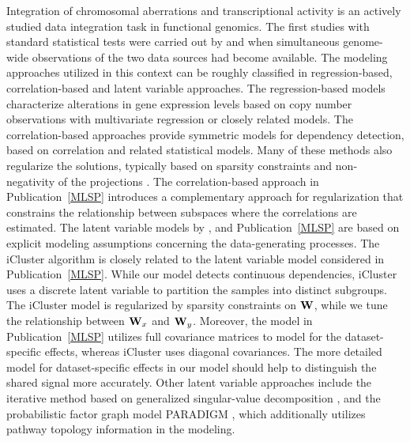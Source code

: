 Integration of chromosomal aberrations and transcriptional activity is
an actively studied data integration task in functional genomics. The
first studies with standard statistical tests were carried out by
\citet{Hyman2002} and \citet{Phillips2001} when simultaneous
genome-wide observations of the two data sources had become available.
The modeling approaches utilized in this context can be roughly
classified in regression-based, correlation-based and latent variable
approaches. The regression-based models \citep{Adler2006, Bicciato09,
  Wieringen09} characterize alterations in gene expression levels
based on copy number observations with multivariate regression or
closely related models. The correlation-based approaches
\citep{Gonzalez2009, Schafer09, Soneson2010} provide symmetric models
for dependency detection, based on correlation and related statistical
models. Many of these methods also regularize the solutions, typically
based on sparsity constraints and non-negativity of the projections
\citep{LeCao2009, Waaijenborg2008, Witten09, Parkhomenko2009}. The
correlation-based approach in Publication~\ref{MLSP} introduces a
complementary approach for regularization that constrains the
relationship between subspaces where the correlations are
estimated. The latent variable models by \cite{Berger06, Shen09,
  Vaske2010}, and Publication~\ref{MLSP} are based on explicit
modeling assumptions concerning the data-generating processes. The
iCluster algorithm \citep{Shen09} is closely related to the latent
variable model considered in Publication~\ref{MLSP}. While our model
detects continuous dependencies, iCluster uses a discrete latent
variable to partition the samples into distinct subgroups.  The
iCluster model is regularized by sparsity constraints on \(\mathbf{W}\), while
we tune the relationship between \(\mathbf{W}_x\) and \(\mathbf{W}_y\). Moreover, the
model in Publication~\ref{MLSP} utilizes full covariance matrices to
model for the dataset-specific effects, whereas iCluster uses diagonal
covariances. The more detailed model for dataset-specific effects in
our model should help to distinguish the shared signal more
accurately. Other latent variable approaches include the iterative
method based on generalized singular-value decomposition
\citep{Berger06}, and the probabilistic factor graph model PARADIGM
\citep{Vaske2010}, which additionally utilizes pathway topology
information in the modeling.

